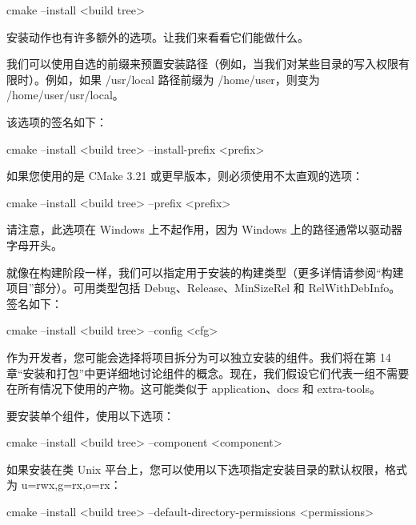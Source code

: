 \begin{shell}
cmake --install <build tree>
\end{shell}

安装动作也有许多额外的选项。让我们来看看它们能做什么。


我们可以使用自选的前缀来预置安装路径（例如，当我们对某些目录的写入权限有限时）。例如，如果 /usr/local 路径前缀为 /home/user，则变为 /home/user/usr/local。

该选项的签名如下：

\begin{shell}
cmake --install <build tree> --install-prefix <prefix>
\end{shell}

如果您使用的是 CMake 3.21 或更早版本，则必须使用不太直观的选项：

\begin{shell}
cmake --install <build tree> --prefix <prefix>
\end{shell}

请注意，此选项在 Windows 上不起作用，因为 Windows 上的路径通常以驱动器字母开头。


就像在构建阶段一样，我们可以指定用于安装的构建类型（更多详情请参阅“构建项目”部分）。可用类型包括 Debug、Release、MinSizeRel 和 RelWithDebInfo。签名如下：

\begin{shell}
cmake --install <build tree> --config <cfg>
\end{shell}


作为开发者，您可能会选择将项目拆分为可以独立安装的组件。我们将在第 14 章“安装和打包”中更详细地讨论组件的概念。现在，我们假设它们代表一组不需要在所有情况下使用的产物。这可能类似于 application、docs 和 extra-tools。

要安装单个组件，使用以下选项：

\begin{shell}
cmake --install <build tree> --component <component>
\end{shell}


如果安装在类 Unix 平台上，您可以使用以下选项指定安装目录的默认权限，格式为 u=rwx,g=rx,o=rx：

\begin{shell}
cmake --install <build tree>
      --default-directory-permissions <permissions>
\end{shell}

